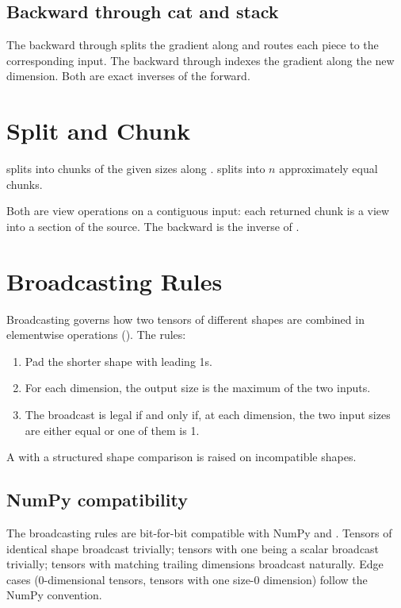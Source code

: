 \subsection{Backward through cat and stack}
\label{ssec:shape_view:concat_back}

The backward through  splits the gradient along
 and routes each piece to the corresponding input. The
backward through  indexes the gradient along the new
dimension. Both are exact inverses of the forward.

\section{Split and Chunk}
\label{sec:shape_view:split}

 splits  into chunks of the
given sizes along . 
splits into \(n\) approximately equal chunks.

Both are view operations on a contiguous input: each returned
chunk is a view into a section of the source. The backward is the
inverse of .

\section{Broadcasting Rules}
\label{sec:shape_view:broadcast}

Broadcasting governs how two tensors of different shapes are
combined in elementwise operations
(). The rules:

\begin{enumerate}
  \item Pad the shorter shape with leading 1s.
  \item For each dimension, the output size is the maximum of the
    two inputs.
  \item The broadcast is legal if and only if, at each dimension,
    the two input sizes are either equal or one of them is 1.
\end{enumerate}

A  with a structured shape comparison is raised
on incompatible shapes.

\subsection{NumPy compatibility}
\label{ssec:shape_view:numpy_compat}

The broadcasting rules are bit-for-bit compatible with NumPy and
. Tensors of identical shape broadcast trivially;
tensors with one being a scalar broadcast trivially; tensors with
matching trailing dimensions broadcast naturally. Edge cases
(0-dimensional tensors, tensors with one size-0 dimension) follow
the NumPy convention.

